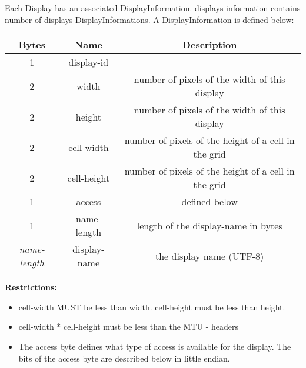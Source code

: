 Each Display has an associated DisplayInformation. displays-information contains
number-of-displays DisplayInformations. A DisplayInformation is defined below:

\begin{center}
    \begin{tabular}{|c|c|c|}
        \hline
        \textbf{Bytes}     & \textbf{Name} & \textbf{Description}                                 \\
        \hline
        1                  & display-id    &                                                      \\
        \hline
        2                  & width         & number of pixels of the width of this display        \\
        \hline
        2                  & height        & number of pixels of the width of this display        \\
        \hline
        2                  & cell-width    & number of pixels of the height of a cell in the grid \\
        \hline
        2                  & cell-height   & number of pixels of the height of a cell in the grid \\
        \hline
        1                  & access        & defined below                                        \\
        \hline
        1                  & name-length   & length of the display-name in bytes                  \\
        \hline
        \emph{name-length} & display-name  & the display name (UTF-8)                             \\
        \hline
    \end{tabular}
\end{center}

\textbf{Restrictions:}

\begin{itemize}
    \item cell-width MUST be less than width. cell-height must be less than height.\\
    \item cell-width * cell-height must be less than the MTU - headers
    \item The access byte defines what type of access is available for the display. The bits of the
    access byte are described below in little endian.
\end{itemize}



